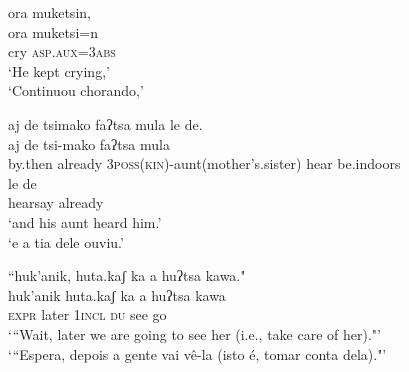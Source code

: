 \documentclass[output=paper,
modfonts,nonflat
]{langsci/langscibook}
\begin{document}
\ea ora muketsin,\\[.3em]
\gll ora  muketsi=n\\          
cry  \textsc{asp.aux}=\textsc{3abs}\\      
\glt ‘He kept crying,'\\
‘Continuou chorando,’
\z

\ea aj de tsimako faʔtsa mula le de.\\[.3em]
\gll aj	de   tsi-mako     faʔtsa   mula\\  
by.then   already   \textsc{3poss(kin)}-aunt(mother's.sister) hear       be.indoors\\



\gll le  de\\                                              
hearsay   already\\
\glt ‘and his aunt heard him.'\\
‘e a tia dele ouviu.’
\z

\ea “huk'anik, huta.kaʃ ka a huʔtsa kawa."\\[.3em]
\gll huk'anik    huta.kaʃ   ka      a       huʔtsa  kawa\\
\textsc{expr}  later \textsc{1incl} \textsc{du} see go\\
\glt ‘“Wait, later we are going to see her (i.e., take care of her)."'\\
‘“Espera, depois a gente vai vê-la (isto é, tomar conta dela)."'
\z
 
\end{document}
